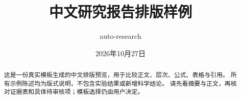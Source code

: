\documentclass[lang=cn,chinesefont=nofont,bibend=bibtex,a4paper,11pt]{elegantpaper}
\title{中文研究报告排版样例}
\author{auto-research}
\date{2026年10月27日}
\begin{document}
\maketitle
\begin{abstract}
这是一份真实模板生成的中文排版预览，用于比较正文、层次、公式、表格与引用。
所有示例陈述均为版式说明，不包含实验结果或新增科学结论。
请先看摘要与正文，再核对证据表和具体待审核项；模板选择仍由用户决定。
\end{abstract}

\clearpage

\printbibliography[title={参考文献}]
\end{document}
